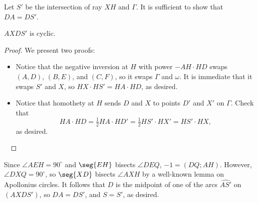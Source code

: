 Let $S'$ be the intersection of ray $XH$ and $\Gamma$. It is sufficient to show that $DA=DS'$.
\begin{claim*}
    $AXDS'$ is cyclic.
\end{claim*}
\begin{proof}
    We present two proofs:
    \begin{itemize}
        \item Notice that the negative inversion at $H$ with power $-AH\cdot HD$ swaps $(A,D)$, $(B,E)$, and $(C,F)$, so it swaps $\Gamma$ and $\omega$. It is immediate that it swaps $S'$ and $X$, so $HX\cdot HS'=HA\cdot HD$, as desired.
        \item Notice that homothety at $H$ sends $D$ and $X$ to points $D'$ and $X'$ on $\Gamma$. Check that \[HA\cdot HD=\tfrac12HA\cdot HD'=\tfrac12HS'\cdot HX'=HS'\cdot HX,\]
            as desired.
    \end{itemize}\
\end{proof}

Since $\angle AEH=90^\circ$ and $\seg{EH}$ bisects $\angle DEQ$, $-1=(DQ;AH)$. However, $\angle DXQ=90^\circ$, so $\seg{XD}$ bisects $\angle AXH$ by a well-known lemma on Apollonius circles. It follows that $D$ is the midpoint of one of the arcs $\widehat{AS'}$ on $(AXDS')$, so $DA=DS'$, and $S=S'$, as desired.
